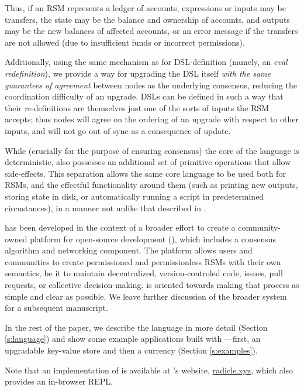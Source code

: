 Thus, if an RSM represents a ledger of accounts, expressions or inputs may be transfers, the
state may be the balance and ownership of accounts, and outputs may be the new
balances of affected accounts, or an error message if the transfers are not
allowed (due to insufficient funds or incorrect permissions).

Additionally, using the same mechanism as for DSL-definition (namely, an
\emph{eval redefinition}), we provide a way for upgrading the DSL itself
\emph{with the same guarantees of agreement} between nodes as the underlying
consensus, reducing the coordination difficulty of an upgrade. DSLs can be
defined in such a way that their \emph{re}-definitions are themselves just one of the
sorts of inputs the RSM accepts; thus nodes will agree on the ordering of an
upgrade with respect to other inputs, and will not go out of sync as a
consequence of update.

While (crucially for the purpose of ensuring consensus) the core of the language
is deterministic, \rad{} also possesses an additional set of primitive operations
that allow side-effects. This separation allows the same core language to be used
both for RSMs, and the effectful functionality around them (such as printing
new outputs, storing state in disk, or automatically running a script in
predetermined circustances), in a manner not unlike that described in
\cite{Cartwright1994}.

\rad{} has been developed in the context of a broader effort to create a
community-owned platform for open-source development (\oscoin{}), which
includes a consensus algorithm and networking component. The \oscoin{}
platform allows users and communities to create permissioned and permissionless
RSMs with their own semantics, be it to maintain decentralized,
version-controled code, issues, pull requests, or collective decision-making.
\rad{} is
oriented towards making that process as simple and clear as possible. We leave further
discussion of the broader \oscoin{} system for a subsequent manuscript.

In the rest of the paper, we describe the language in more detail (Section
\ref{s:language}) and show some example applications built with \rad{}---first,
an upgradable key-value store and then a currency
(Section \ref{s:examples}).

Note that an implementation of \rad{} is available at \rad{}'s website,
\url{radicle.xyz}, which also provides an in-browser REPL.
